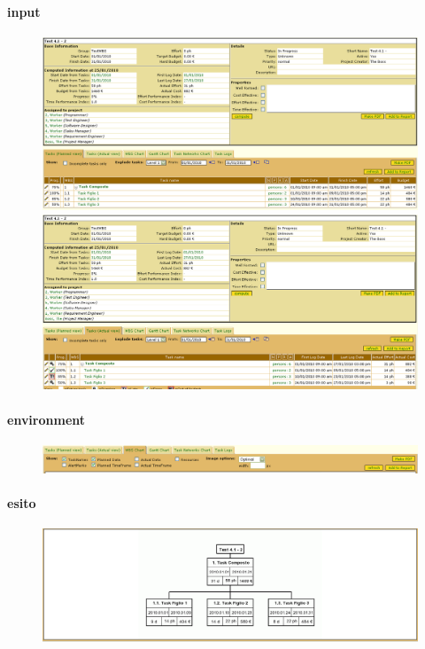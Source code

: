 \paragraph{input}
\begin{figure}
\centering
\includegraphics[width=\textwidth]{tests/TEST_WBS/4.1/4.1_2/Esempio_1/input.png}
\includegraphics[width=\textwidth]{tests/TEST_WBS/4.1/4.1_2/Esempio_1/input_actual.png}
\end{figure}
\paragraph{environment}
\begin{figure}
\centering
\includegraphics[width=\textwidth]{tests/TEST_WBS/4.1/4.1_2/Esempio_1/environment.png}
\end{figure}
\paragraph{esito}
\begin{figure}
\centering
\includegraphics[width=\textwidth]{tests/TEST_WBS/4.1/4.1_2/Esempio_1/output.png}
\end{figure}

